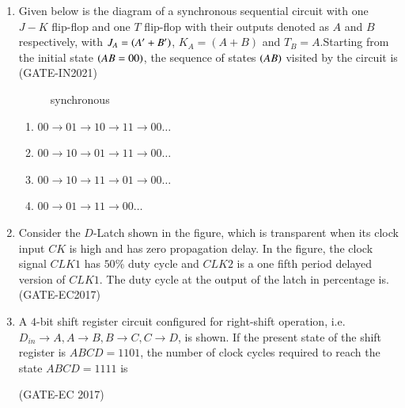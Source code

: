 \begin{enumerate}
 \item Given below is the diagram of a synchronous sequential circuit with one $J-K$ flip-flop and one $T$ flip-flop with their outputs denoted as $A$ and $B$ respectively, with $J_{A}=\left(A^{\prime}+B^{\prime}\right)$, $K_{A}=(A+B)$ and $T_{B}=A$.Starting from the initial state $\left(AB=00\right)$, the sequence of states $\left(AB\right)$ visited by the circuit is
\hfill(GATE-IN2021)
	      \begin{figure}[H]
		      \centering
		      
		      \caption{synchronous}
		      \label{}
	      \end{figure}
		  \begin{enumerate}
          \item $00 \rightarrow 01 \rightarrow 10 \rightarrow 11 \rightarrow 00 
          \dots $
          \item $00 \rightarrow 10 \rightarrow 01 \rightarrow 11 \rightarrow 00 
          \dots $
          \item $00 \rightarrow 10 \rightarrow 11 \rightarrow 01 \rightarrow 00 \dots $
          \item $00 \rightarrow 01 \rightarrow 11 \rightarrow 00 \dots $
      \end{enumerate}
  \item Consider the $D$-Latch shown in the figure, which is transparent when its clock input $CK$ is high and has zero propagation delay. In the figure, the clock signal $CLK1$ has $50\%$ duty cycle and $CLK2$ is a one fifth period delayed version of $CLK1$. The duty cycle at the output of the latch in percentage is.
  \hfill(GATE-EC2017)
	      \begin{figure}[H]
		      \begin{center}
			      
			      \caption{}
		      \end{center}
	      \end{figure}
\item A $4$-bit shift register circuit configured for right-shift operation, i.e.\\ $D_{in} \rightarrow A, A \rightarrow B, B \rightarrow C, C \rightarrow D$, is shown. If the present state of the shift register is $ABCD = 1101$, the number of clock cycles required to reach the state $ABCD = 1111$ is

\hfill (GATE-EC 2017)
\begin{figure}[H]
    \centering
	
 	\caption{}
\end{figure}


\end{enumerate}
